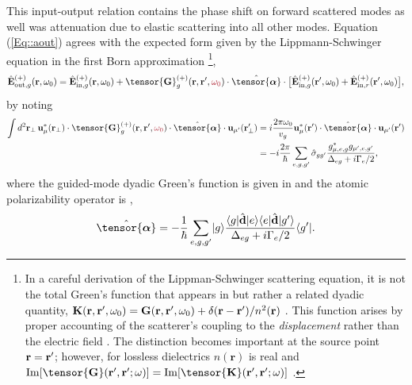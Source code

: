 \documentclass[preprint, aps,pra,onecolumn]{revtex4-1} %
\newcommand{\inp}{{\rm in}}
\newcommand{\out}{{\rm out}}
\newcommand{\poltens}{\hat{\tensor{\boldsymbol{\alpha}}}}
\newcommand{\comment}[1]{{\color{Maroon} #1}}
\begin{document}
This input-output relation contains the phase shift on forward scattered modes as well was attenuation due to elastic scattering into all other modes.
Equation (\ref{Eq::aout}) agrees with the expected form given by the Lippmann-Schwinger equation in the first Born approximation \footnote{In a careful derivation of the Lippman-Schwinger scattering equation, it is not the total Green's function that appears in  but rather a related dyadic quantity, $\mathbf{K}(\mathbf{r},\mathbf{r}', \omega_0) = \mathbf{G}(\mathbf{r},\mathbf{r}', \omega_0) + \delta(\mathbf{r}-\mathbf{r}')/n^2(\mathbf{r})$ \cite{wubs_multiple-scattering_2004}. 
This function arises by proper accounting of the scatterer's coupling to the \emph{displacement} rather than the electric field \cite{yao_ultrahigh_2009}.  The distinction becomes important at the source point $\mathbf{r} = \mathbf{r}'$; however, for lossless dielectrics $n(\mathbf{r})$ is real and ${\rm Im}[\tensor{\mathbf{G}}(\br',\br'; \omega)] = {\rm Im}[\tensor{\mathbf{K}}(\br',\br'; \omega)]$ \cite{yao_-chip_2010}. },
	\begin{equation} \label{Eq::IOScatteredField}
		\hat{\mathbf{E}}^{(+)}_{\out,g}(\br, \omega_0)=\hat{\mathbf{E}}^{(+)}_{ \inp, g}(\br, \omega_0)+\tensor{\mathbf{G}}_g^{(+)}(\br,\br',\comment{\omega_0})\cdot \poltens \cdot \big[\hat{\mathbf{E}}^{(+)}_{\inp, g}(\br', \omega_0)+\hat{\mathbf{E}}^{(+)}_{\inp,r}(\br', \omega_0) \big],
	\end{equation}
by noting
	\begin{align}
		\int d^2 \mbf{r}_\perp \, \mathbf{u}^*_{\mu} (\br_\perp)\cdot \tensor{\mathbf{G}}_g^{(+)}(\br,\br',\comment{\omega_0})\cdot \poltens \cdot \mathbf{u}_{\mu'} (\br'_\perp) &= i \frac{ 2\pi \omega_0}{v_g} \mathbf{u}^*_\mu (\br') \cdot \poltens \cdot \mathbf{u}_{\mu'} (\br') \\
		& = - i \frac{2 \pi}{\hbar} \sum_{e,g,g'}  \hat{\sigma}_{gg'} \frac{g_{\mu,e,g}^* g_{\mu',e,g'}}{ \Delta_{eg} + i \Gamma_{e}/2 }, 
	\end{align}
where the guided-mode dyadic Green's function is given in  and the atomic polarizability operator is \cite{buhmann_casimir-polder_2004, deutsch_quantum_2010,kien_dynamical_2013},
	\begin{equation} \label{Eq::PolarizabilityOperator}
		\poltens = - \frac{1}{\hbar} \sum_{e,g,g'}\ket{g}\frac{\bra{g}\hat{\mathbf{d}}\ket{e}\bra{e} 
\hat{\mathbf{d}}\ket{g'}}{\Delta_{eg} + i \Gamma_{e}/2 }\bra{g'}.
	\end{equation}	
\end{document}

